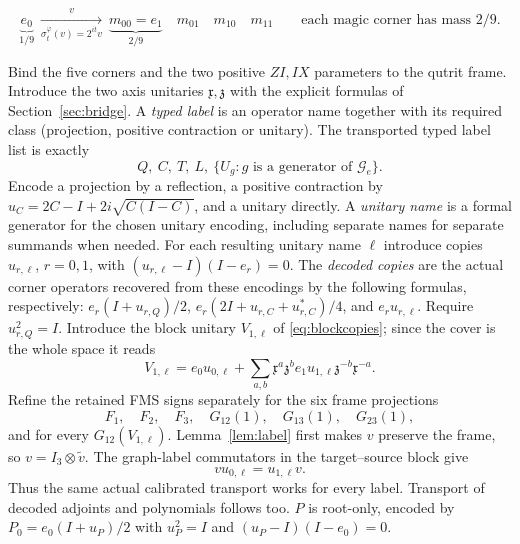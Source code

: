 \begin{center}\begin{minipage}{\linewidth}
\centering
\[
 \underbrace{e_0}_{1/9}
 \ \xrightarrow[\sigma_t^\varphi(v)=2^{it}v]{v}\
 \boxed{\underbrace{m_{00}=e_1}_{2/9}\quad
 m_{01}\quad m_{10}\quad m_{11}}
 \qquad\text{each magic corner has mass }2/9.
\]
\end{minipage}\end{center}

Bind the five corners and the two positive $ZI,IX$ parameters to the qutrit frame. Introduce the two axis unitaries $\mathfrak x,\mathfrak z$ with the explicit formulas of Section~\ref{sec:bridge}. A \emph{typed label} is an operator name together with its required class (projection, positive contraction or unitary). The transported typed label list is exactly
\begin{equation}\label{eq:labels}
 Q,\ C,\ T,\ L,\ \{U_g:g\text{ is a generator of }\mathcal G_e\}.
\end{equation}
Encode a projection by a reflection, a positive contraction by $u_C=2C-I+2i\sqrt{C(I-C)}$, and a unitary directly. A \emph{unitary name} is a formal generator for the chosen unitary encoding, including separate names for separate summands when needed. For each resulting unitary name $\ell$ introduce copies $u_{r,\ell}$, $r=0,1$, with $(u_{r,\ell}-I)(I-e_r)=0$. The \emph{decoded copies} are the actual corner operators recovered from these encodings by the following formulas, respectively: $e_r(I+u_{r,Q})/2$, $e_r(2I+u_{r,C}+u_{r,C}^*)/4$, and $e_ru_{r,\ell}$. Require $u_{r,Q}^2=I$. Introduce the block unitary $V_{1,\ell}$ of \eqref{eq:blockcopies}; since the cover is the whole space it reads
\[
 V_{1,\ell}=e_0u_{0,\ell}+
 \sum_{a,b}\mathfrak x^a\mathfrak z^b e_1u_{1,\ell}\mathfrak z^{-b}\mathfrak x^{-a}.
\]
Refine the retained FMS signs separately for the six frame projections
\[
 F_1,\quad F_2,\quad F_3,\quad G_{12}(1),\quad G_{13}(1),\quad G_{23}(1),
\]
and for every $G_{12}(V_{1,\ell})$. Lemma~\ref{lem:label} first makes $v$ preserve the frame, so $v=I_3\otimes\widetilde v$. The graph-label commutators in the target--source block give
\begin{equation}\label{eq:transport}
 vu_{0,\ell}=u_{1,\ell}v.
\end{equation}
Thus the same actual calibrated transport works for every label. Transport of decoded adjoints and polynomials follows too. $P$ is root-only, encoded by $P_0=e_0(I+u_P)/2$ with $u_P^2=I$ and $(u_P-I)(I-e_0)=0$.

